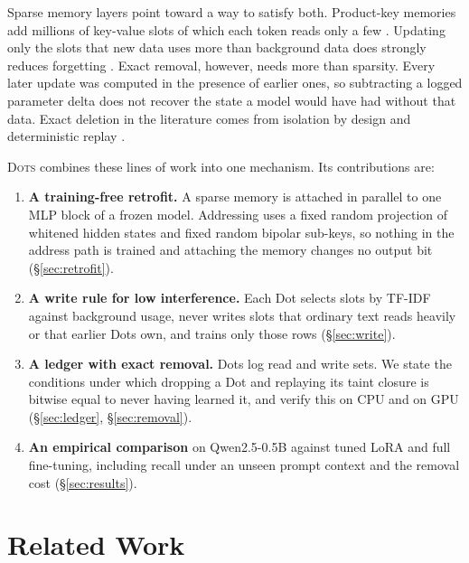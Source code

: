 \documentclass[journal]{IEEEtran}
\newcommand{\sys}{\textsc{Dots}}
\let\citep\cite \let\citet\cite
\begin{document}
Sparse memory layers point toward a way to satisfy both. Product-key memories add millions of key-value slots of which each token reads only a few \citep{lample2019pkm,berges2024memory}. Updating only the slots that new data uses more than background data does strongly reduces forgetting \citep{lin2025smf,goyal2026improving,gupta2026smf}. Exact removal, however, needs more than sparsity. Every later update was computed in the presence of earlier ones, so subtracting a logged parameter delta does not recover the state a model would have had without that data. Exact deletion in the literature comes from isolation by design and deterministic replay \citep{bourtoule2021sisa,x2025trace,kuo2025sift}.

\sys{} combines these lines of work into one mechanism. Its contributions are:

\begin{enumerate}
  \item \textbf{A training-free retrofit.} A sparse memory is attached in parallel to one MLP block of a frozen model. Addressing uses a fixed random projection of whitened hidden states and fixed random bipolar sub-keys, so nothing in the address path is trained and attaching the memory changes no output bit (\S\ref{sec:retrofit}).
  \item \textbf{A write rule for low interference.} Each Dot selects slots by TF-IDF against background usage, never writes slots that ordinary text reads heavily or that earlier Dots own, and trains only those rows (\S\ref{sec:write}).
  \item \textbf{A ledger with exact removal.} Dots log read and write sets. We state the conditions under which dropping a Dot and replaying its taint closure is bitwise equal to never having learned it, and verify this on CPU and on GPU (\S\ref{sec:ledger}, \S\ref{sec:removal}).
  \item \textbf{An empirical comparison} on Qwen2.5-0.5B against tuned LoRA and full fine-tuning, including recall under an unseen prompt context and the removal cost (\S\ref{sec:results}).
\end{enumerate}

\section{Related Work}
\end{document}
